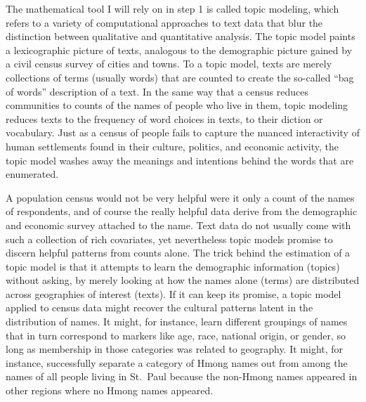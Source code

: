 \documentclass[]{book}
\theoremstyle{definition}
\theoremstyle{definition}
\theoremstyle{definition}
\theoremstyle{remark}
\begin{document}
The mathematical tool I will rely on in step 1 is called topic modeling,
which refers to a variety of computational approaches to text data that
blur the distinction between qualitative and quantitative analysis. The
topic model paints a lexicographic picture of texts, analogous to the
demographic picture gained by a civil census survey of cities and towns.
To a topic model, texts are merely collections of terms (usually words)
that are counted to create the so-called ``bag of words'' description of
a text. In the same way that a census reduces communities to counts of
the names of people who live in them, topic modeling reduces texts to
the frequency of word choices in texts, to their diction or vocabulary.
Just as a census of people fails to capture the nuanced interactivity of
human settlements found in their culture, politics, and economic
activity, the topic model washes away the meanings and intentions behind
the words that are enumerated.

A population census would not be very helpful were it only a count of
the names of respondents, and of course the really helpful data derive
from the demographic and economic survey attached to the name. Text data
do not usually come with such a collection of rich covariates, yet
nevertheless topic models promise to discern helpful patterns from
counts alone. The trick behind the estimation of a topic model is that
it attempts to learn the demographic information (topics) without
asking, by merely looking at how the names alone (terms) are distributed
across geographies of interest (texts). If it can keep its promise, a
topic model applied to census data might recover the cultural patterns
latent in the distribution of names. It might, for instance, learn
different groupings of names that in turn correspond to markers like
age, race, national origin, or gender, so long as membership in those
categories was related to geography. It might, for instance,
successfully separate a category of Hmong names out from among the names
of all people living in St.~Paul because the non-Hmong names appeared in
other regions where no Hmong names appeared.
\end{document}

